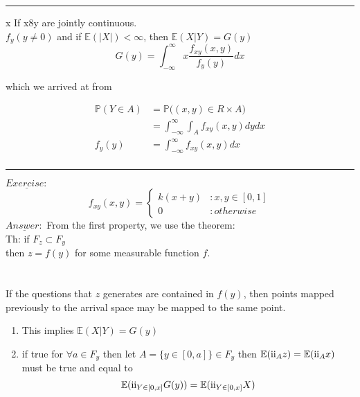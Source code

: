 \documentclass{article}
\newcommand{\RN}[1]{%
  \textup{\uppercase\expandafter{\romannumeral#1}}%
}
\begin{document}
\noindent\rule{15cm}{0.4pt}%

x If x8y are jointly continuous.                                              \\
$f_{y}(y \neq 0)$ and if $\mathbb{E}(|X|) < \infty$, then 
$\mathbb{E}(X|Y) = G(y)$                                                      \\

$$G(y) = \int_{-\infty}^{\infty} x\dfrac{f_{xy}(x,y)}{f_{y}(y)} dx$$

which we arrived at from

\begin{equation*}
  \begin{split}
    \mathbb{P}(Y \in A) &= 
    \mathbb{P}\big( (x,y) \in R \times A\big)                                 \\
                        &= 
    \int_{-\infty}^{\infty}\int_{A}^{} f_{xy}(x,y) dydx                       \\
    f_{y}(y)            &=
    \int_{-\infty}^{\infty} f_{xy}(x,y) dx                                    \\
  \end{split}
\end{equation*}

\noindent\rule{15cm}{0.4pt}%

$\underline{Exercise:}$                                                       \\
\begin{displaymath}
   f_{xy}(x,y) = \left\{
     \begin{array}{lr}
       k(x+y) & : x,y \in [0,1]\\
       0 & : otherwise
     \end{array}
   \right.
\end{displaymath} 
$\underline{Answer:}$
From the first property, we use the theorem:                                  \\

Th: if $ F_{z} \subset F_{y}$\\
then $z = f(y)$ for some measurable function $f$.\\
\\
\\
If the questions that $z$ generates are contained in $f(y)$, then points mapped previously to the arrival space  may be mapped to the same point.\\
\begin{enumerate}
\item This implies $ \mathbb{E}(X|Y) = G(y)$
\item if true for $\forall a \in F_{y}$ then let 
$A = \{ y \in [0,a]\} \in F_{y}$ then $\mathbb{E}(\RN{2}_{A}z)
 = \mathbb{E}(\RN{2}_{A}x)$ must be true and equal to 
$$\mathbb{E}(\RN{2}_{Y \in [0,x]}G(y)) = \mathbb{E}(\RN{2}_{Y\in[0,x]}X)$$    \\
\end{enumerate}
\end{document}
